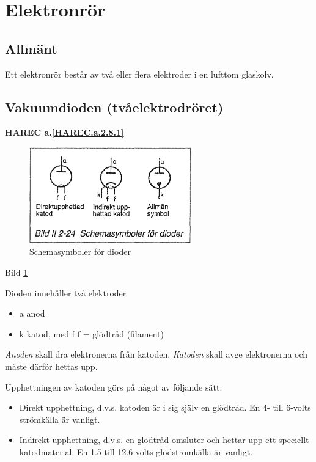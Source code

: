 \section{Elektronrör}
\label{elektronrör}

\subsection{Allmänt}

Ett elektronrör består av två eller flera elektroder i en lufttom glaskolv.

\subsection{Vakuumdioden (tvåelektrodröret)}
\textbf{HAREC a.\ref{HAREC.a.2.8.1}\label{myHAREC.a.2.8.1}}
\label{vakuumdioden}

\begin{figure}[h]
\begin{center}
\includegraphics[width=7cm]{images/bild_2_2-24}
\caption{Schemasymboler för dioder}
\label{fig:BildII2-24}
\end{center}
\end{figure}

Bild \ref{fig:BildII2-24}

Dioden innehåller två elektroder
\begin{itemize}
\item a anod
\item k katod, med f f = glödtråd (filament)
\end{itemize}

\emph{Anoden} skall dra elektronerna från katoden.
\emph{Katoden} skall avge elektronerna och måste därför hettas upp.

Upphettningen av katoden görs på något av följande sätt:
\begin{itemize}
\item Direkt upphettning, d.v.s. katoden är i sig själv en glödtråd. En 4-
  till 6-volts strömkälla är vanligt.
\item Indirekt upphettning, d.v.s. en glödtråd omsluter och hettar upp ett
  speciellt katodmaterial. En 1.5 till 12.6 volts glödströmkälla är vanligt.
\end{itemize}

